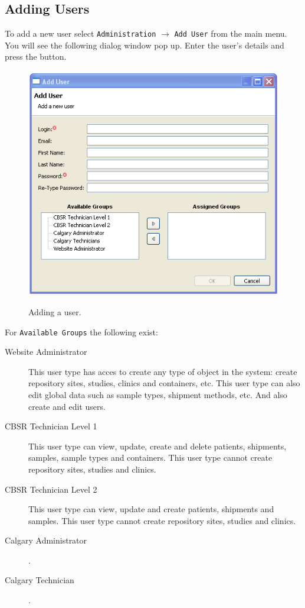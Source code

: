 \subsection{Adding Users}
To add a new user select \texttt{Administration} $\to$ \texttt{Add User}
from the main menu. You will see the following dialog window pop up. Enter the
user's details and press the  button.
\begin{figure}[H]
  \centering
  \scalebox{0.5}
	   { \includegraphics*{screenshots/administration/add_user} }
	   \caption{Adding a user.}
	   \label{fig:add_user}
\end{figure}

For \texttt{Available Groups} the following exist:
\begin{description}
\item[Website Administrator] This user type has acces to create any type of
  object in the system: create repository sites, studies, clinics and
  containers, etc. This user type can also edit global data such as sample
  types, shipment methods, etc. And also create and edit users.
\item[CBSR Technician Level 1] This user type can view, update, create and
  delete patients, shipments, samples, sample types and containers. This user
  type cannot create repository sites, studies and clinics.
\item[CBSR Technician Level 2] This user type can view, update and create
  patients, shipments and samples. This user type cannot create repository
  sites, studies and clinics.
\item[Calgary Administrator] .
\item[Calgary Technician] .
\end{description}

